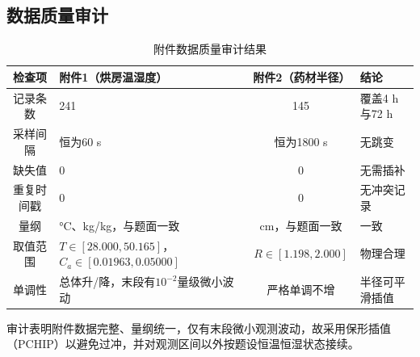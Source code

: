 \documentclass[zihao=-4,UTF8]{ctexart}
\begin{document}
\subsection{数据质量审计}
\begin{table}[H]\centering\small
\caption{附件数据质量审计结果}\label{tab:dataaudit}
\begin{tabularx}{\textwidth}{cYcY}
\toprule 检查项 & 附件1（烘房温湿度） & 附件2（药材半径） & 结论 \\
\midrule 记录条数 & 241 & 145 & 覆盖4 h与72 h \\
采样间隔 & 恒为60 s & 恒为1800 s & 无跳变 \\
缺失值 & 0 & 0 & 无需插补 \\
重复时间戳 & 0 & 0 & 无冲突记录 \\
量纲 & °C、kg/kg，与题面一致 & cm，与题面一致 & 一致 \\
取值范围 & $T\in[28.000,50.165]$，$C_a\in[0.01963,0.05000]$ & $R\in[1.198,2.000]$ & 物理合理 \\
单调性 & 总体升/降，末段有$10^{-2}$量级微小波动 & 严格单调不增 & 半径可平滑插值 \\
\bottomrule
\end{tabularx}
\end{table}
审计表明附件数据完整、量纲统一，仅有末段微小观测波动，故采用保形插值（PCHIP）\cite{ref7}以避免过冲，并对观测区间以外按题设恒温恒湿状态接续。
\end{document}
